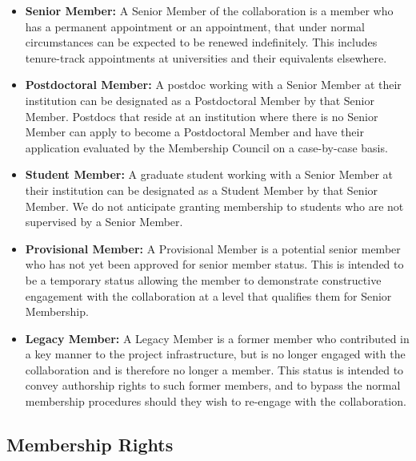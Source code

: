 \begin{itemize}

\item {\bf Senior Member:} A Senior Member of the collaboration is a member who has a permanent appointment or an appointment, that under normal circumstances can be expected to be renewed indefinitely.   This includes tenure-track appointments at universities and their equivalents elsewhere.  

\item {\bf Postdoctoral Member:} A postdoc working with a Senior Member at their institution can be designated as a Postdoctoral Member by that Senior Member.  Postdocs that reside at an institution where there is no Senior Member can apply to become a Postdoctoral Member and have their application evaluated by the Membership Council on a case-by-case basis. 

\item {\bf Student Member:} A graduate student working with a Senior Member at their institution can be designated as a Student Member by that Senior Member.  We do not anticipate granting membership to students who are not supervised by a Senior Member.

\item {\bf Provisional Member:}  A Provisional Member is a potential senior member who has not yet been approved for senior member status.  This is intended to be a temporary status allowing the member to demonstrate constructive engagement with the collaboration at a level that qualifies them for Senior Membership.

\item {\bf Legacy Member:}  A Legacy Member is a former member who contributed in a key manner to the project infrastructure, but is no longer engaged with the collaboration and is therefore no longer a member.  This status is intended to convey authorship rights to such former members, and to bypass the normal membership procedures should they wish to re-engage with the collaboration.

\end{itemize}



\subsection{Membership Rights}

